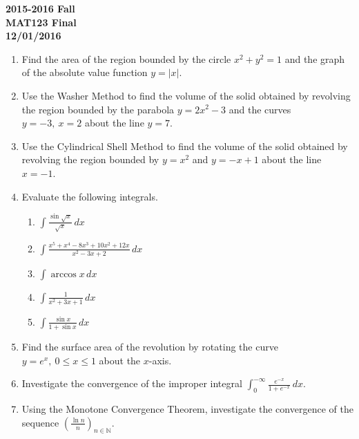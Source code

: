 \documentclass[a4paper, 12pt]{article}
\begin{document}
\newpage
{}
{}

\begin{center}
\textbf{2015-2016 Fall\\MAT123 Final\\12/01/2016}
\end{center}

\begin{enumerate}[leftmargin=*,label=\textbf{\arabic*.}]

\item Find the area of the region bounded by the circle $x^2+y^2=1$ and the graph of the absolute value function $y=\left|x\right|$.

\item Use the Washer Method to find the volume of the solid obtained by revolving the region bounded by the parabola $y=2x^2-3$ and the curves $y=-3,\:x=2$ about the line $y=7$.

\item Use the Cylindrical Shell Method to find the volume of the solid obtained by revolving the region bounded by $y=x^2$ and $y=-x+1$ about the line $x=-1$.

\item Evaluate the following integrals.

\begin{enumerate}[leftmargin=*,label=\textbf{\alph*.}]
\item $\displaystyle\int\frac{\sin \sqrt x}{\sqrt x}\,dx$
\item $\displaystyle\int\frac{x^5+x^4-8x^3+10x^2+12x}{x^2-3x+2}\,dx$
\item $\displaystyle\int\arccos x\,dx$
\item $\displaystyle\int\frac1{x^2+3x+1}\,dx$
\item $\displaystyle\int\frac{\sin x}{1+\sin x}\,dx$
\end{enumerate}

\item Find the surface area of the revolution by rotating the curve $y= e^x,\:0\leq x\leq1$ about the $x$-axis.

\item Investigate the convergence of the improper integral $\displaystyle\int_0^{-\infty}\frac{ e^{-x}}{1+ e^{-x}}\,dx$.

\item Using the Monotone Convergence Theorem, investigate the convergence of the sequence $\displaystyle\left(\frac{\ln n}n\right)_{n\in\mathbb{N}}$.

\end{enumerate}
\end{document}
